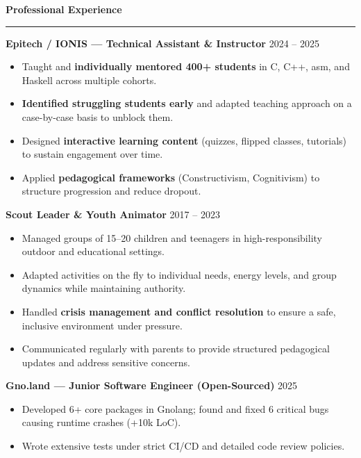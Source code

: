 \documentclass{article}
\begin{document}
\par\vspace{5pt}

{\large\bfseries Professional Experience}
\par\vspace{-8pt}
\rule{\linewidth}{0.4pt}
\par\vspace{5pt}

{\bfseries Epitech / IONIS --- Technical Assistant \& Instructor} \hfill 2024 -- 2025
\begin{itemize}[noitemsep, topsep=0pt]
    \item Taught and {\bfseries individually mentored 400+ students} in C, C++, asm, and Haskell across multiple cohorts.
    \item {\bfseries Identified struggling students early} and adapted teaching approach on a case-by-case basis to unblock them.
    \item Designed {\bfseries interactive learning content} (quizzes, flipped classes, tutorials) to sustain engagement over time.
    \item Applied {\bfseries pedagogical frameworks} (Constructivism, Cognitivism) to structure progression and reduce dropout.
\end{itemize}

\par\vspace{5pt}

{\bfseries Scout Leader \& Youth Animator} \hfill 2017 -- 2023
\begin{itemize}[noitemsep, topsep=0pt]
    \item Managed groups of 15--20 children and teenagers in high-responsibility outdoor and educational settings.
    \item Adapted activities on the fly to individual needs, energy levels, and group dynamics while maintaining authority.
    \item Handled {\bfseries crisis management and conflict resolution} to ensure a safe, inclusive environment under pressure.
    \item Communicated regularly with parents to provide structured pedagogical updates and address sensitive concerns.
\end{itemize}

\par\vspace{5pt}

{\bfseries Gno.land --- Junior Software Engineer (Open-Sourced)} \hfill 2025
\begin{itemize}[noitemsep, topsep=0pt]
    \item Developed 6+ core packages in Gnolang; found and fixed 6 critical bugs causing runtime crashes (+10k LoC).
    \item Wrote extensive tests under strict CI/CD and detailed code review policies.
\end{itemize}
\end{document}
